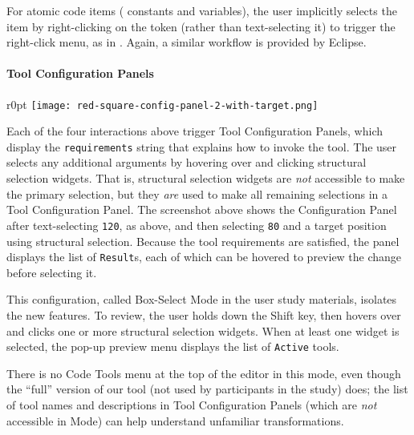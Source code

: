 
For atomic code items (\ie{} constants and variables), the user implicitly
selects the item by right-clicking on the token (rather than text-selecting it)
to trigger the right-click menu, as in . Again, a similar
workflow is provided by Eclipse.

\finishInteractionList{}

\paragraph{Tool Configuration Panels}


\begin{wrapfigure}{r}{0pt}
\texttt{[image: red-square-config-panel-2-with-target.png]}
\end{wrapfigure}
Each of the four interactions above trigger Tool Configuration Panels, which
display the \verb+requirements+ string that explains how to invoke the tool.
The user selects any additional arguments by hovering over and clicking
structural selection widgets. That is, structural selection widgets are
\emph{not} accessible to make the primary selection, but they \emph{are} used to
make all remaining selections in a Tool Configuration Panel.
The screenshot above shows the Configuration Panel after text-selecting
\verb+120+, as above, and then selecting \verb+80+ and a target position using
structural selection. Because the tool requirements are satisfied,
the panel displays the list of \verb+Result+s,
each of which can be hovered to preview the change before selecting it.



This configuration, called Box-Select Mode in the user study materials, isolates
the new \deuce{} features.
To review, the user holds down the Shift key, then hovers over and clicks one or more
structural \maybecode{} selection widgets. When at least one widget is
selected, the pop-up preview menu displays the list of \verb+Active+ tools.

There is no Code Tools menu at the top of the editor in this mode, even
though the ``full'' version of our tool (not used by participants in the study)
does; the list of tool names and descriptions in Tool Configuration Panels (which
are \emph{not} accessible in \deuce{} Mode) can help understand unfamiliar
transformations.

